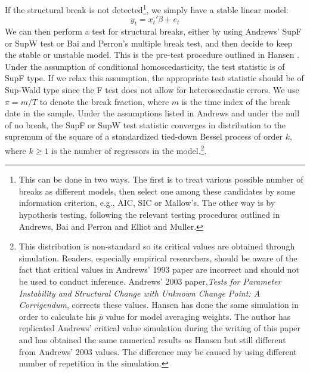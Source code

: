If the structural break is not detected\footnote{This can be done in two ways. The first is to treat various possible number of breaks as different models, then select one among these candidates by some information criterion, e.g., AIC, SIC or Mallow's. The other way is by hypothesis testing, following the relevant testing procedures outlined in Andrews\cite{andrews93}, Bai and Perron\cite{bai_perron98} and Elliot and Muller\cite{elliott_muller_RES2006}. }, we simply have a stable linear model:
\begin{equation}
	y_t = x_t'\beta + e_t
\end{equation}
We can then perform a test for structural breaks, either by using Andrews' SupF or SupW test or Bai and Perron's multiple break test, and then decide to keep the stable or unstable model. This is the pre-test procedure outlined in Hansen \cite{hansen2009averaging}. Under the assumption of conditional homoscedasticity, the test statistic is of SupF type. If we relax this assumption, the appropriate test statistic should be of Sup-Wald type since the F test does not allow for heteroscedastic errors. We use $\pi = m/T$ to denote the break fraction, where $m$ is the time index of the break date in the sample. Under the assumptions listed in Andrews \cite{andrews93} and under the null of no break, the SupF or SupW test statistic converges in distribution to the supremum of the square of a standardized tied-down Bessel process of order $k$, where $k \geq 1$ is the number of regressors in the model.\footnote{This distribution is non-standard so its critical values are obtained through simulation. Readers, especially empirical researchers, should be aware of the fact that critical values in Andrews' 1993 paper are incorrect and should not be used to conduct inference. Andrews' 2003 paper,\emph{Tests for Parameter Instability and Structural Change with Unknown Change Point: A Corrigendum}, corrects these values. Hansen \cite{hansen2009averaging} has done the same simulation in order to calculate his $\bar{p}$ value for model averaging weights. The author has replicated Andrews' critical value simulation during the writing of this paper and has obtained the same numerical results as Hansen but still different from Andrews' 2003 values. The difference may be caused by using different number of repetition in the simulation.}.

